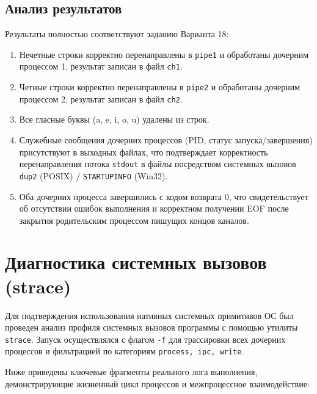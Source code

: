 \documentclass[pdf, unicode, 12pt, a4paper, oneside, fleqn]{article}
\begin{document}
\subsection*{Анализ результатов}
Результаты полностью соответствуют заданию Варианта 18:
\begin{enumerate}
    \item Нечетные строки корректно перенаправлены в \texttt{pipe1} и обработаны дочерним процессом 1, результат записан в файл \texttt{ch1}.
    \item Четные строки корректно перенаправлены в \texttt{pipe2} и обработаны дочерним процессом 2, результат записан в файл \texttt{ch2}.
    \item Все гласные буквы (a, e, i, o, u) удалены из строк.
    \item Служебные сообщения дочерних процессов (PID, статус запуска/завершения) присутствуют в выходных файлах, что подтверждает корректность перенаправления потока \texttt{stdout} в файлы посредством системных вызовов \texttt{dup2} (POSIX) / \texttt{STARTUPINFO} (Win32).
    \item Оба дочерних процесса завершились с кодом возврата 0, что свидетельствует об отсутствии ошибок выполнения и корректном получении EOF после закрытия родительским процессом пишущих концов каналов.
\end{enumerate}
\pagebreak


\section*{Диагностика системных вызовов (strace)}
Для подтверждения использования нативных системных примитивов ОС был проведен анализ профиля системных вызовов программы с помощью утилиты \texttt{strace}. Запуск осуществлялся с флагом \texttt{-f} для трассировки всех дочерних процессов и фильтрацией по категориям \texttt{process, ipc, write}.

Ниже приведены ключевые фрагменты реального лога выполнения, демонстрирующие жизненный цикл процессов и межпроцессное взаимодействие:
\end{document}
